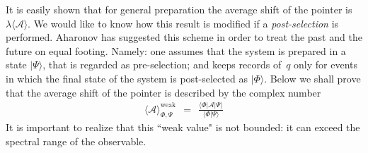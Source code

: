 \documentclass[onecolumn,fleqn, 11pt]{revtex4}
\newcommand{\tbox}[1]{\text{#1}}
\newcommand{\beq}{\begin{eqnarray}}
\newcommand{\eeq}{\end{eqnarray}}
\begin{document}
It is easily shown that for general preparation 
the average shift of the pointer 
is ${\lambda \langle \mathcal{A} \rangle}$. 
We would like to know how this result is modified 
if a {\em post-selection} is performed. 
Aharonov has suggested this scheme in order to treat 
the past and the future on equal footing. 
Namely: one assumes that the system is prepared in a state $|\Psi\rangle$, 
that is regarded as pre-selection; 
and keeps records of~$q$ only for events 
in which the final state of the system is post-selected as $|\Phi\rangle$.   
Below we shall prove that the average shift of the pointer 
is described by the complex number 
\beq
\langle\mathcal{A}\rangle_{\Phi,\Psi}^{\tbox{weak}} 
\ \ = \ \  
\frac{ \langle \Phi |\mathcal{A}| \Psi \rangle}
{\langle \Phi | \Psi \rangle}
\eeq
It is important to realize that this ``weak value" is not bounded:
it can exceed the spectral range of the observable. 
\end{document}
